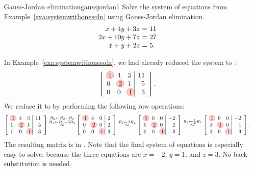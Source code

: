 \begin{example}{Gauss-Jordan elimination}{gaussjordan1}
  Solve the system of equations from
  Example~\ref{exa:systemwithonesoln} using Gauss-Jordan elimination.
  \begin{equation*}
    \begin{array}{r@{~}c@{~}l}
      x+4y+3z &=& 11\\
      2x+10y+7z &=& 27\\
      x+y+2z &=& 5.
    \end{array}
  \end{equation*}
\end{example}

\begin{solution}
  In Example~\ref{exa:systemwithonesoln}, we had already reduced the
  system to {\ef}:
  \begin{equation*}
    \leftB
    \begin{array}{rrr|r}
      \circled{1} & 4 & 3 & 11 \\
      0 & \circled{2} & 1 & 5 \\
      0 & 0 & \circled{1} & 3
    \end{array}
    \rightB.
  \end{equation*}
  We reduce it to {\rref} by performing the following row operations:
  \begin{equation*}
    \leftB
    \begin{array}{rrr|r}
      \circled{1} & 4 & 3 & 11 \\
      0 & \circled{2} & 1 & 5 \\
      0 & 0 & \circled{1} & 3
    \end{array}
    \rightB
    \stackrel{R_2\leftarrow R_2-R_3}{\stackrel{R_1\leftarrow R_1-3R_3}{\sim}}
    \leftB
    \begin{array}{rrr|r}
      \circled{1} & 4 & 0 & 2 \\
      0 & \circled{2} & 0 & 2 \\
      0 & 0 & \circled{1} & 3
    \end{array}
    \rightB
    \stackrel{R_1\leftarrow 2R_2}{\sim}
    \leftB
    \begin{array}{rrr|r}
      \circled{1} & 0 & 0 & -2 \\
      0 & \circled{2} & 0 & 2 \\
      0 & 0 & \circled{1} & 3
    \end{array}
    \rightB
    \stackrel{R_2\leftarrow \frac{1}{2}R_2}{\sim}
    \leftB
    \begin{array}{rrr|r}
      \circled{1} & 0 & 0 & -2 \\
      0 & \circled{1} & 0 & 1 \\
      0 & 0 & \circled{1} & 3
    \end{array}
    \rightB.
  \end{equation*}
  The resulting matrix is in {\rref}. Note that the final system of
  equations is especially easy to solve, because the three equations
  are $x=-2$, $y=1$, and $z=3$. No back substitution is needed.
\end{solution}

